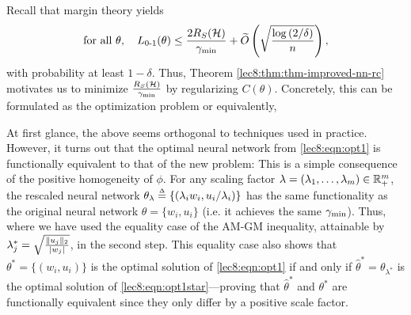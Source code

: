 Recall that margin theory yields
\begin{equation}
\text{for all } \theta, \quad L_{\textup{0-1}}(\theta) \leq \frac{2R_S(\mathcal H)}{\gamma_{\mathrm{min}}} + \widetilde{O}\left(\sqrt{\frac{\log \left( 2 / \delta \right)}{n}}\right), \label{lec8:eqn:margin-bound}
\end{equation}
with probability at least $1 -\delta$. Thus, Theorem \ref{lec8:thm:thm-improved-nn-rc} motivates us to minimize $\frac{R_S(\mathcal H)}{\gamma_{\mathrm{min}}}$ by regularizing $C(\theta)$. Concretely, this can be formulated as the optimization problem 
or equivalently,

At first glance, the above seems orthogonal to techniques used in practice. However, it turns out that the optimal neural network from \eqref{lec8:eqn:opt1} is functionally equivalent to that of the new problem:
This is a simple consequence of the positive homogeneity of $\phi$. For any scaling factor $\lambda=(\lambda_1, \dots, \lambda_m)\in \mathbb R_+^m$, the rescaled neural network $\theta_\lambda \defeq \{(\lambda_i w_i, u_i/\lambda_i)\}$ has the same functionality as the original neural network $\theta = \{w_i, u_i \}$ (i.e. it achieves the same $\gamma_{\mathrm{min}}$). Thus, 
where we have used the equality case of the AM-GM inequality, attainable by $\lambda_j^* = \sqrt{\frac{\|u_j\|_2}{|w_j|}}$, in the second step. This equality case also shows that $\theta^* = \{(w_i, u_i ) \}$ is the optimal solution of \eqref{lec8:eqn:opt1} if and only if $\hat{\theta}^* = \theta_{\lambda^*}$ is the optimal solution of \eqref{lec8:eqn:opt1star}---proving that $\hat{\theta}^*$ and $\theta^*$ are functionally equivalent since they only differ by a positive scale factor. 

